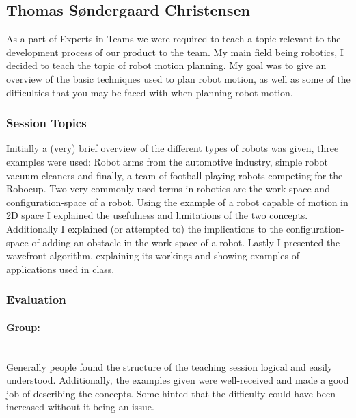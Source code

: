 \subsection{Thomas Søndergaard Christensen}
As a part of Experts in Teams we were required to teach a topic relevant to the development process of our product to the team. My main field being robotics, I decided to teach the topic of robot motion planning. My goal was to give an overview of the basic techniques used to plan robot motion, as well as some of the difficulties that you may be faced with when planning robot motion.
\subsubsection{Session Topics}
Initially a (very) brief overview of the different types of robots was given, three examples were used: Robot arms from the automotive industry, simple robot vacuum cleaners and finally, a team of football-playing robots competing for the Robocup.
Two very commonly used terms in robotics are the work-space and configuration-space of a robot. Using the example of a robot capable of motion in 2D space I explained the usefulness and limitations of the two concepts. Additionally I explained (or attempted to) the implications to the configuration-space of adding an obstacle in the work-space of a robot.
Lastly I presented the wavefront algorithm, explaining its workings and showing examples of applications used in class.
\subsubsection{Evaluation}
\paragraph{Group:}~\\
Generally people found the structure of the teaching session logical and easily understood. Additionally, the examples given were well-received and made a good job of describing the concepts. Some hinted that the difficulty could have been increased without it being an issue.
